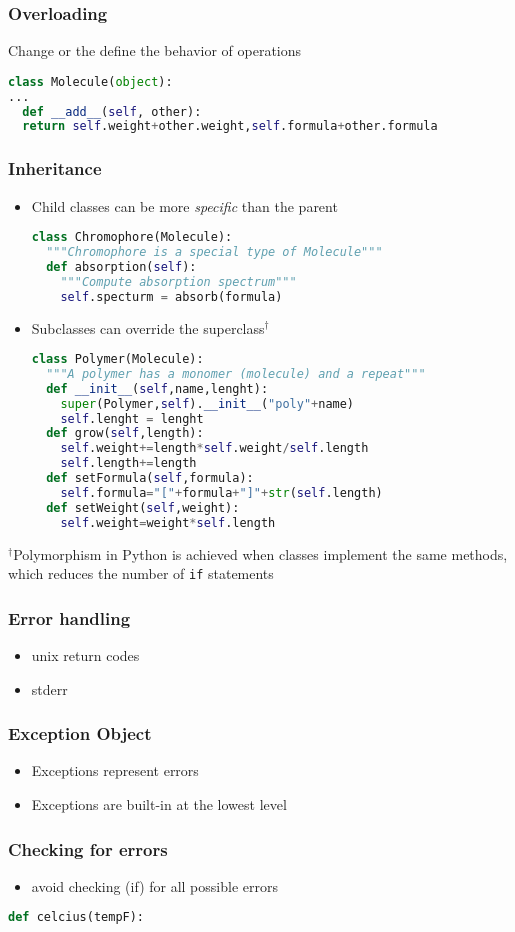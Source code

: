 \documentclass[xcolor=table,10pt,final]{beamer}
\begin{document}
\begin{frame}[fragile]
  \frametitle{Overloading}
  Change or the define the behavior of operations
  \begin{lstlisting}[language=python]
class Molecule(object):
...
  def __add__(self, other):
  return self.weight+other.weight,self.formula+other.formula
  \end{lstlisting}
\end{frame}

\begin{frame}[fragile]
  \frametitle{Inheritance}
  \begin{itemize}
    \item Child classes can be more {\it specific} than the parent\\
      \begin{lstlisting}[language=python]
class Chromophore(Molecule):
  """Chromophore is a special type of Molecule"""
  def absorption(self):
    """Compute absorption spectrum"""
    self.specturm = absorb(formula)
      \end{lstlisting}
    \item Subclasses can override the superclass$^\dagger$\\
  \begin{lstlisting}[language=python]
class Polymer(Molecule):
  """A polymer has a monomer (molecule) and a repeat"""
  def __init__(self,name,lenght):
    super(Polymer,self).__init__("poly"+name)
    self.lenght = lenght
  def grow(self,length):
    self.weight+=length*self.weight/self.length
    self.length+=length
  def setFormula(self,formula):
    self.formula="["+formula+"]"+str(self.length)
  def setWeight(self,weight):
    self.weight=weight*self.length
  \end{lstlisting}
  \end{itemize}
  $^\dagger${\scriptsize Polymorphism in Python is achieved when classes implement the same methods, which reduces the number of {\tt if} statements}
\end{frame}

\begin{frame}
  \frametitle{Error handling}
  \begin{itemize}
    \item unix return codes
    \item stderr
  \end{itemize}
\end{frame}

\begin{frame}
  \frametitle{Exception Object}
  \begin{itemize}
    \item Exceptions represent errors
    \item Exceptions are built-in at the lowest level
  \end{itemize}
\end{frame}

\begin{frame}[fragile]
  \frametitle{Checking for errors}
  \begin{itemize}
    \item avoid checking (if) for all possible errors
  \end{itemize}
  \begin{lstlisting}[language=Python]
def celcius(tempF):
\end{lstlisting}
\end{frame}
\end{document}
